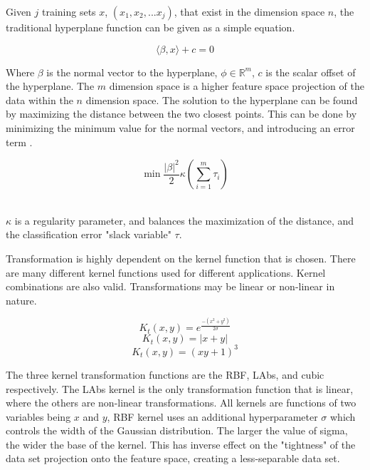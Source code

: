         Given $j$ training sets $x$, $(x_1, x_2, ...x_j)$, that exist in the dimension space $n$, the traditional hyperplane function can be given as a simple equation.

        \begin{equation} \label{eq:hyperplane}
            \langle \beta, x\rangle + c = 0
        \end{equation}

        Where $\beta$ is the normal vector to the hyperplane, $\phi \in \mathbb{R}^m$, $c$ is the scalar offset of the hyperplane. The $m$ dimension space is a higher feature space projection of the data within the $n$ dimension space. The solution to the hyperplane can be found by maximizing the distance between the two closest points. This can be done by minimizing the minimum value for the normal vectors, and introducing an error term \cite{elen_adaptive_2022} \cite{burges_tutorial_nodate}. 
        
        \begin{equation}
            \min \frac{|\beta|^2}{2} \kappa(\sum^m_{i=1} \tau_i)
        \end{equation}\

        $\kappa$ is a regularity parameter, and balances the maximization of the distance, and the classification error "slack variable" $\tau$. 
        
        Transformation is highly dependent on the kernel function that is chosen. There are many different kernel functions used for different applications. Kernel combinations are also valid. Transformations may be linear or non-linear in nature. 

        \begin{equation}
            K_t(x,y) = e^{\frac{-(x^2 + y^2)}{2\sigma}}
        \end{equation}
        \begin{equation}
            K_t(x,y) = |x + y|
        \end{equation}
        \begin{equation}
            K_t(x,y) = (xy + 1)^3
        \end{equation}

        The three kernel transformation functions are the RBF, LAbs, and cubic respectively. The LAbs kernel is the only transformation function that is linear, where the others are non-linear transformations. All kernels are functions of two variables being $x$ and $y$, RBF kernel uses an additional hyperparameter $\sigma$ which controls the width of the Gaussian distribution. The larger the value of sigma, the wider the base of the kernel. This has inverse effect on the "tightness" of the data set projection onto the feature space, creating a less-separable data set. 

